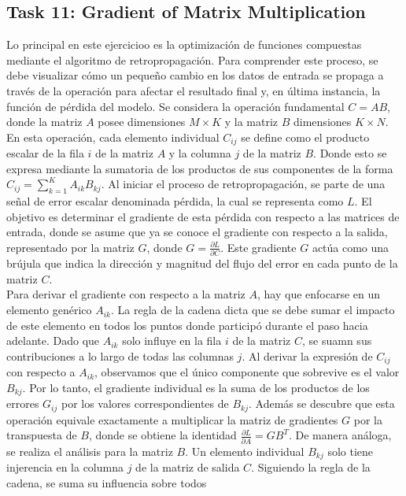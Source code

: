 \documentclass[12pt]{article}
\begin{document}
\subsection*{Task 11: Gradient of Matrix Multiplication}
Lo principal en este ejercicioo es la optimización de funciones 
compuestas mediante el algoritmo de retropropagación. Para comprender este proceso, se debe 
visualizar cómo un pequeño cambio en los datos de entrada se propaga a 
través de la operación para afectar el resultado final y, en última instancia,
la función de pérdida del modelo.
Se considera la operación fundamental $C = AB$, donde la matriz $A$ posee 
dimensiones $M \times K$ y la matriz $B$ dimensiones $K \times N$. En esta operación, 
cada elemento individual $C_{ij}$ se define como el producto
escalar de la fila $i$ de la matriz $A$ y la columna $j$ de la matriz $B$.
Donde esto se expresa mediante la sumatoria de los productos de
sus componentes de la forma $C_{ij} = \sum_{k=1}^{K} A_{ik} B_{kj}$.
Al iniciar el proceso de retropropagación, se parte de una señal de error 
escalar denominada pérdida, la cual se representa como $L$. El objetivo es determinar 
el gradiente de esta pérdida con respecto a las matrices de entrada, donde se asume 
que ya se conoce el gradiente con respecto a la salida, representado por la matriz 
$G$, donde $G = \frac{\partial L}{\partial C}$. Este gradiente $G$ actúa como una 
brújula que indica la dirección y magnitud del flujo del error en cada punto de 
la matriz $C$. \\
Para derivar el gradiente con respecto a la matriz $A$, hay que enfocarse en un
elemento genérico $A_{ik}$. La regla de la cadena dicta que se debe sumar el impacto de este elemento en 
todos los puntos donde participó durante el paso hacia adelante.
Dado que $A_{ik}$ solo influye en la fila $i$ de la matriz $C$, se suamn sus 
contribuciones a lo largo de todas las columnas $j$. Al derivar la expresión 
de $C_{ij}$ con respecto a $A_{ik}$, observamos que el único componente que 
sobrevive es el valor $B_{kj}$. Por lo tanto, el gradiente individual es la 
suma de los productos de los errores $G_{ij}$ por los valores correspondientes 
de $B_{kj}$. Además se descubre que esta operación equivale exactamente a multiplicar la matriz de gradientes $G$ por 
la transpuesta de $B$, donde se obtiene la identidad $\frac{\partial L}{\partial A} = G B^T$.
De manera análoga, se realiza el análisis para la matriz $B$. Un elemento 
individual $B_{kj}$ solo tiene injerencia en la columna $j$ de la matriz de 
salida $C$. Siguiendo la regla de la cadena, se suma su influencia sobre todos 
\end{document}
